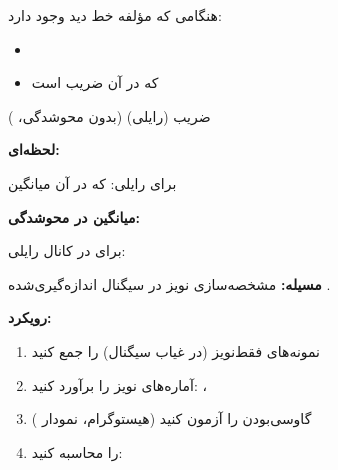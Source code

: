 هنگامی که مؤلفه خط دید  وجود دارد:

\begin{itemize}
\tightlist
\item
\item
   که در آن  ضریب  است
\end{itemize}

ضریب  (رایلی)  (بدون محوشدگی، )


\textbf{ لحظه‌ای:} 

برای رایلی:  که در آن  میانگین

\textbf{میانگین  در محوشدگی:}

برای  در کانال رایلی: 



\textbf{مسیله:} مشخصه‌سازی نویز در سیگنال اندازه‌گیری‌شده .

\textbf{رویکرد:}

\begin{enumerate}
\def\labelenumi{\arabic{enumi}.}
\tightlist
\item
  نمونه‌های فقط‌نویز (در غیاب سیگنال) را جمع کنید
\item
  آماره‌های نویز را برآورد کنید: ، 
\item
  گاوسی‌بودن را آزمون کنید (هیستوگرام، نمودار )
\item
   را محاسبه کنید: 
\end{enumerate}


